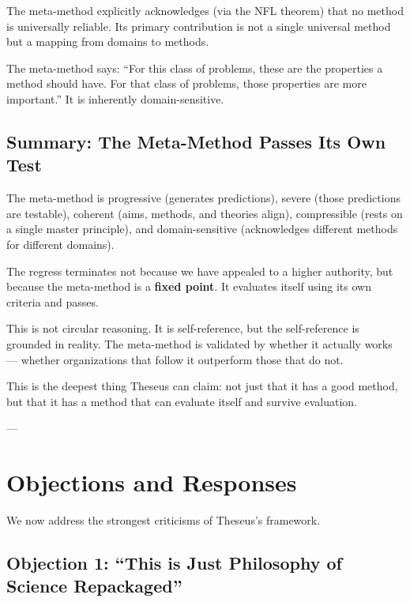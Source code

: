 \documentclass[11pt,letterpaper]{article}
\begin{document}
The meta-method explicitly acknowledges (via the NFL theorem) that no method is universally reliable. Its primary contribution is not a single universal method but a mapping from domains to methods.

The meta-method says: ``For this class of problems, these are the properties a method should have. For that class of problems, those properties are more important.'' It is inherently domain-sensitive.

\subsection*{Summary: The Meta-Method Passes Its Own Test}

The meta-method is progressive (generates predictions), severe (those predictions are testable), coherent (aims, methods, and theories align), compressible (rests on a single master principle), and domain-sensitive (acknowledges different methods for different domains).

The regress terminates not because we have appealed to a higher authority, but because the meta-method is a \textbf{fixed point}. It evaluates itself using its own criteria and passes.

This is not circular reasoning. It is self-reference, but the self-reference is grounded in reality. The meta-method is validated by whether it actually works — whether organizations that follow it outperform those that do not.

This is the deepest thing Theseus can claim: not just that it has a good method, but that it has a method that can evaluate itself and survive evaluation.

---

\newpage


\section{Objections and Responses}

We now address the strongest criticisms of Theseus's framework.

\subsection*{Objection 1: ``This is Just Philosophy of Science Repackaged''}
\end{document}
